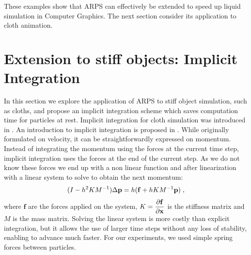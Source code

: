 These examples show that ARPS can effectively be extended to speed up liquid simulation in Computer Graphics. The next section consider its application to cloth animation.

\section{Extension to stiff objects: Implicit Integration} 
\label{sec:arps_implicit}
In this section we explore the application of ARPS to stiff object simulation, such as cloths, and propose an implicit integration scheme which saves computation time for particles at rest.
Implicit integration for cloth simulation was introduced in \cite{Baraff1998}. 
An introduction to implicit integration is proposed in \cite{Witkin2001}.
While originally formulated on velocity, it can be straightforwardly expressed on momentum.
Instead of integrating the momentum using the forces at the current time step, implicit integration uses the forces at the end of the current step.
As we do not know these forces we end up with a non linear function and after linearization with a linear system to solve to obtain the next momentum:
\begin{equation}
    \label{eq:implicit}
    ( I -h^{2}KM^{-1} ) \Delta \mathbf{p} = h( \mathbf{f} + h KM^{-1}\mathbf{p} ) \;,
\end{equation}
where $\mathbf{f}$ are the forces applied on the system, $\displaystyle K = \frac{\partial \mathbf{f}}{ \partial \mathbf{x}}$ is the stiffness matrix and $M$ is the mass matrix. 
Solving the linear system is more costly than explicit integration, but it allows the use of larger time steps without any loss of stability, enabling to advance much faster.
For our experiments, we used simple spring forces between particles.
